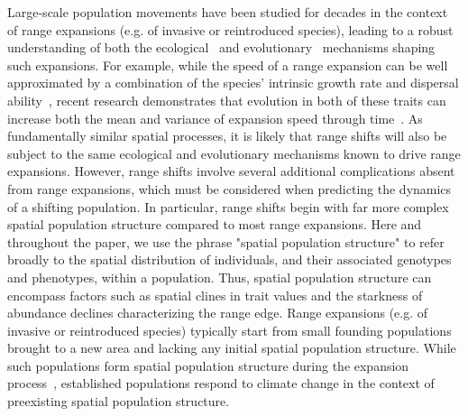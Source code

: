 \documentclass[11pt]{article}
\begin{document}
Large-scale population movements have been studied for decades in the context of range expansions (e.g. of invasive or reintroduced species), leading to a robust understanding of both the ecological~\citep{hastings2005spatial} and evolutionary~\citep{shine2011evolutionary, excoffier2009genetic} mechanisms shaping such expansions. For example, while the speed of a range expansion can be well approximated by a combination of the species' intrinsic growth rate and dispersal ability~\citep{fisher1937wave, hastings2005spatial}, recent research demonstrates that evolution in both of these traits can increase both the mean and variance of expansion speed through time~\citep{weiss2017rapid, ochocki2017rapid, szHucs2017rapid, shaw2015dispersal, phillips2015evolutionary}. As fundamentally similar spatial processes, it is likely that range shifts will also be subject to the same ecological and evolutionary mechanisms known to drive range expansions. However, range shifts involve several additional complications absent from range expansions, which must be considered when predicting the dynamics of a shifting population. In particular, range shifts begin with far more complex spatial population structure compared to most range expansions. Here and throughout the paper, we use the phrase "spatial population structure" to refer broadly to the spatial distribution of individuals, and their associated genotypes and phenotypes, within a population. Thus, spatial population structure can encompass factors such as spatial clines in trait values and the starkness of abundance declines characterizing the range edge. Range expansions (e.g. of invasive or reintroduced species) typically start from small founding populations brought to a new area and lacking any initial spatial population structure. While such populations form spatial population structure during the expansion process~\citep{weiss2017rapid, ochocki2017rapid}, established populations respond to climate change in the context of preexisting spatial population structure. 
\end{document}
